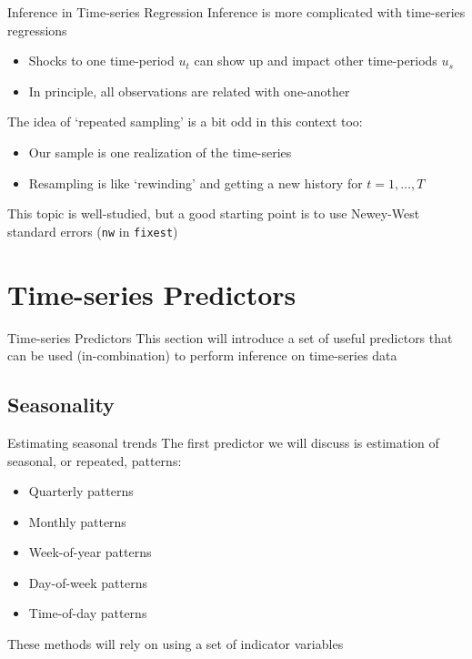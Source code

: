 \documentclass[aspectratio=169,t,11pt,table]{beamer}
\begin{document}
\begin{frame}{Inference in Time-series Regression}
  Inference is more complicated with time-series regressions
  
  \begin{itemize}
    \item Shocks to one time-period $u_t$ can show up and impact other time-periods $u_s$
    \item In principle, all observations are related with one-another
  \end{itemize}

  \pause
  \bigskip\medskip
  The idea of `repeated sampling' is a bit odd in this context too:
  \begin{itemize}
    \item Our sample is one realization of the time-series
    
    \item Resampling is like `rewinding' and getting a new history for $t = 1, \dots, T$
  \end{itemize}

  \pause
  \bigskip
  This topic is well-studied, but a good starting point is to use Newey-West standard errors (\texttt{nw} in \texttt{fixest})
\end{frame}

\section{Time-series Predictors}

\begin{frame}{Time-series Predictors}
  This section will introduce a set of useful predictors that can be used (in-combination) to perform inference on time-series data
\end{frame}

\subsection{Seasonality}

\begin{frame}{Estimating seasonal trends}
  The first predictor we will discuss is estimation of seasonal, or repeated, patterns:
  \begin{itemize}
    \item Quarterly patterns
    \item Monthly patterns
    \item Week-of-year patterns
    \item Day-of-week patterns
    \item Time-of-day patterns
  \end{itemize}

  \bigskip
  These methods will rely on using a set of indicator variables
\end{frame}
\end{document}
